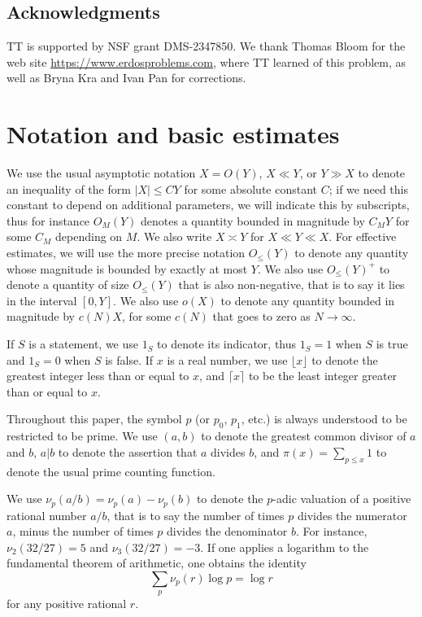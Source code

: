 \documentclass[12pt,a4paper,reqno]{amsart}
\numberwithin{equation}{section}
\theoremstyle{plain}
\theoremstyle{definition}
\begin{document}
\subsection{Acknowledgments}

TT is supported by NSF grant DMS-2347850.  We thank Thomas Bloom for the web site \url{https://www.erdosproblems.com}, where TT learned of this problem, as well as Bryna Kra and Ivan Pan for  corrections.


\section{Notation and basic estimates}

We use the usual asymptotic notation $X = O(Y)$, $X \ll Y$, or $Y \gg X$ to denote an inequality of the form $|X| \leq CY$ for some absolute constant $C$; if we need this constant to depend on additional parameters, we will indicate this by subscripts, thus for instance $O_M(Y)$ denotes a quantity bounded in magnitude by $C_M Y$ for some $C_M$ depending on $M$.  We also write $X \asymp Y$ for $X \ll Y \ll X$. For effective estimates, we will use the more precise notation $O_{\leq}(Y)$ to denote any quantity whose magnitude is bounded by exactly at most $Y$. We also use $O_{\leq}(Y)^+$ to denote a quantity of size $O_{\leq}(Y)$ that is also non-negative, that is to say it lies in the interval $[0,Y]$.  We also use $o(X)$ to denote any quantity bounded in magnitude by $c(N) X$, for some $c(N)$ that goes to zero as $N \to \infty$.

If $S$ is a statement, we use $1_S$ to denote its indicator, thus $1_S=1$ when $S$ is true and $1_S=0$ when $S$ is false.  If $x$ is a real number, we use $\lfloor x \rfloor$ to denote the greatest integer less than or equal to $x$, and $\lceil x \rceil$ to be the least integer greater than or equal to $x$.

Throughout this paper, the symbol $p$ (or $p_0$, $p_1$, etc.) is always understood to be restricted to be prime.  
We use $(a,b)$ to denote the greatest common divisor of $a$ and $b$, $a|b$ to denote the assertion that $a$ divides $b$, and $\pi(x) = \sum_{p \leq x} 1$ to denote the usual prime counting function.

We use $\nu_p(a/b) = \nu_p(a)-\nu_p(b)$ to denote the $p$-adic valuation of a positive rational number $a/b$, that is to say the number of times $p$ divides the numerator $a$, minus the number of times $p$ divides the denominator $b$.  For instance, $\nu_2(32/27)=5$ and $\nu_3(32/27)=-3$.
If one applies a logarithm to the fundamental theorem of arithmetic, one obtains the identity
\begin{equation}\label{ftoa}
  \sum_p \nu_p(r) \log p = \log r
\end{equation}
for any positive rational $r$.  
\end{document}
